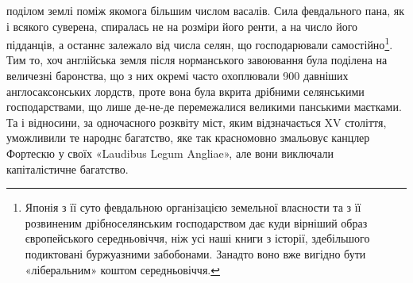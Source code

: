 поділом землі поміж якомога більшим числом васалів.
Сила февдального пана, як і всякого суверена, спиралась не на
розміри його ренти, а на число його підданців, а останнє залежало
від числа селян, що господарювали самостійно\footnote{
Японія з її суто февдальною організацією земельної власности
та з її розвиненим дрібноселянським господарством дає куди вірніший
образ європейського середньовіччя, ніж усі наші книги з історії, здебільшого
подиктовані буржуазними забобонами. Занадто воно вже вигідно
бути «ліберальним» коштом середньовіччя.
}. Тим то,
хоч англійська земля після норманського завоювання була
поділена на величезні баронства, що з них окремі часто охоплювали
900 давніших англосаксонських лордств, проте вона була
вкрита дрібними селянськими господарствами, що лише де-не-де
перемежалися великими панськими маєтками. Та і відносини,
за одночасного розквіту міст, яким відзначається XV століття,
уможливили те народнє багатство, яке так красномовно
змальовує канцлер Фортескю у своїх «Laudibus Legum Angliae»,
але вони виключали капіталістичне багатство.

